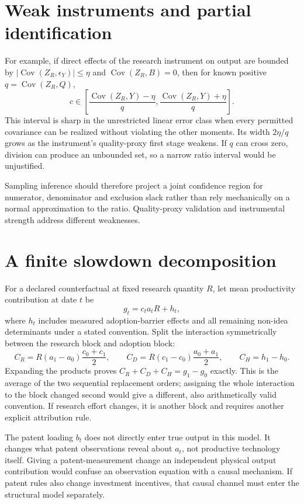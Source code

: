 \documentclass[11pt]{article}
\begin{document}
\section*{Weak instruments and partial identification}
For example, if direct effects of the research instrument on output are bounded by $|\operatorname{Cov}(Z_R,\epsilon_Y)|\leq\eta$ and $\operatorname{Cov}(Z_R,B)=0$, then for known positive $q=\operatorname{Cov}(Z_R,Q)$,
\[
 c\in\left[\frac{\operatorname{Cov}(Z_R,Y)-\eta}{q},
           \frac{\operatorname{Cov}(Z_R,Y)+\eta}{q}\right].
\]
This interval is sharp in the unrestricted linear error class when every permitted covariance can be realized without violating the other moments. Its width $2\eta/q$ grows as the instrument's quality-proxy first stage weakens. If $q$ can cross zero, division can produce an unbounded set, so a narrow ratio interval would be unjustified.

Sampling inference should therefore project a joint confidence region for numerator, denominator and exclusion slack rather than rely mechanically on a normal approximation to the ratio. Quality-proxy validation and instrumental strength address different weaknesses.

\section*{A finite slowdown decomposition}
For a declared counterfactual at fixed research quantity $R$, let mean productivity contribution at date $t$ be
\[
 g_t=c_ta_tR+h_t,
\]
where $h_t$ includes measured adoption-barrier effects and all remaining non-idea determinants under a stated convention. Split the interaction symmetrically between the research block and adoption block:
\[
 C_R=R(a_1-a_0)\frac{c_0+c_1}{2},\qquad
 C_D=R(c_1-c_0)\frac{a_0+a_1}{2},\qquad C_H=h_1-h_0.
\]
Expanding the products proves $C_R+C_D+C_H=g_1-g_0$ exactly. This is the average of the two sequential replacement orders; assigning the whole interaction to the block changed second would give a different, also arithmetically valid convention. If research effort changes, it is another block and requires another explicit attribution rule.

The patent loading $b_t$ does not directly enter true output in this model. It changes what patent observations reveal about $a_t$, not productive technology itself. Giving a patent-measurement change an independent physical output contribution would confuse an observation equation with a causal mechanism. If patent rules also change investment incentives, that causal channel must enter the structural model separately.
\end{document}
